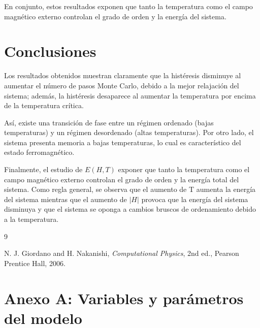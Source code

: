\documentclass[12pt]{article}
\begin{document}
En conjunto, estos resultados exponen que tanto la temperatura como el campo magnético externo controlan el grado de orden y la energía del sistema.

\section{Conclusiones}

Los resultados obtenidos muestran claramente que la histéresis disminuye al aumentar el número de pasos Monte Carlo, debido a la mejor relajación del sistema; además, la histéresis desaparece al aumentar la temperatura por encima de la temperatura crítica. 

Así, existe una transición de fase entre un régimen ordenado (bajas temperaturas) y un régimen desordenado (altas temperaturas). Por otro lado, el sistema presenta memoria a bajas temperaturas, lo cual es característico del estado ferromagnético.

Finalmente, el estudio de $E(H,T)$ exponer que tanto la temperatura como el campo magnético externo controlan el grado de orden y la energía total del sistema. Como regla general, se observa que el aumento de T aumenta la energía del sistema mientras que el aumento de $|H|$ provoca que la energía del sistema disminuya y que el sistema se oponga a cambios bruscos de ordenamiento debido a la temperatura.

\begin{thebibliography}{9}

N. J. Giordano and H. Nakanishi,
\textit{Computational Physics},
2nd ed., Pearson Prentice Hall, 2006.
\label{Giordano}
\end{thebibliography}

\appendix
\section*{Anexo A: Variables y parámetros del modelo}
\end{document}
